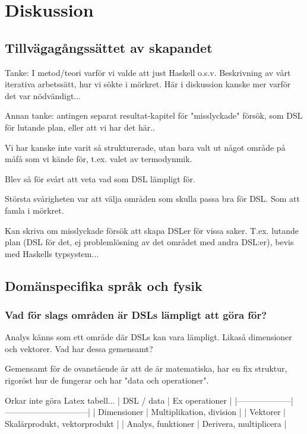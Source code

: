 
\chapter{Diskussion}

\begin{binge}
\section{Tillvägagångssättet av skapandet}

Tanke: I metod/teori varför vi valde att just Haskell o.s.v. Beskrivning av vårt iterativa arbetssätt, hur vi sökte i mörkret. Här i diskussion kanske mer varför det var nödvändigt...

Annan tanke: antingen separat resultat-kapitel för "misslyckade" försök, som DSL för lutande plan, eller att vi har det här..

Vi har kanske inte varit så strukturerade, utan bara valt ut något område på måfå som vi kände för, t.ex. valet av termodynmik.

Blev så för svårt att veta vad som DSL lämpligt för.

Största svårigheten var att välja områden som skulla passa bra för DSL. Som att
famla i mörkret.

Kan skriva om misslyckade försök att skapa DSLer för vissa saker. T.ex. lutande plan (DSL för det, ej problemlösning av det området med andra DSL:er), bevis med Haskells typsystem...

\section{Domänspecifika språk och fysik}

\subsection{Vad för slags områden är DSLs lämpligt att göra för?}
\label{sec:lampligt}

Analys känns som ett område där DSLs kan vara lämpligt. Likaså dimensioner och
vektorer. Vad har dessa gemensamt?

Gemensamt för de ovanstående är att de är matematiska, har en fix struktur,
rigoröst hur de fungerar och har "data och operationer".

Orkar inte göra Latex tabell...
| DSL / data         | Ex operationer               |
|--------------------|------------------------------|
| Dimensioner        | Multiplikation, division     |
| Vektorer           | Skalärprodukt, vektorprodukt |
| Analys, funktioner | Derivera, multiplicera       |


\end{binge}
